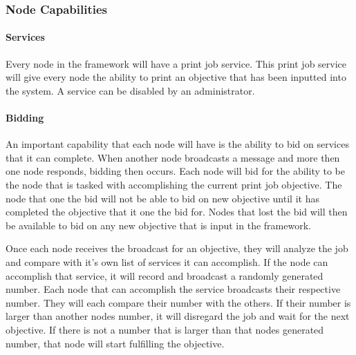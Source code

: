 

\subsubsection{Node Capabilities}
\paragraph{Services}
Every node in the framework will have a print job service. This print job service will give every node the ability to print an objective that has been inputted into the system. A service can be disabled by an administrator.

\paragraph{Bidding}
An important capability that each node will have is the ability to bid on services that it can complete. When another node broadcasts a message and more then one node responds, bidding then occurs. Each node will bid for the ability to be the node that is tasked with accomplishing the current print job objective. The node that one the bid will not be able to bid on new objective until it has completed the objective that it one the bid for. Nodes that lost the bid will then be available to bid on any new objective that is input in the framework.

Once each node receives the broadcast for an objective, they will analyze the job and compare with it's own list of services it can accomplish. If the node can accomplish that service, it will record and broadcast a randomly generated number. Each node that can accomplish the service broadcasts their respective number. They will each compare their number with the others. If their number is larger than another nodes number, it will disregard the job and wait for the next objective. If there is not a number that is larger than that nodes generated number, that node will start fulfilling the objective.

